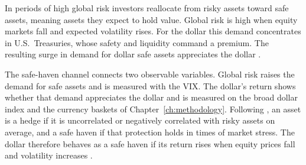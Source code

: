 
In periods of high global risk investors reallocate from risky assets toward safe assets, meaning assets they expect to hold value. Global risk is high when equity markets fall and expected volatility rises. For the dollar this demand concentrates in U.S.\ Treasuries, whose safety and liquidity command a premium. The resulting surge in demand for dollar safe assets appreciates the dollar \parencite{jiang_krishnamurthy_lustig_2021}.
 
The safe-haven channel connects two observable variables. Global risk raises the demand for safe assets and is measured with the VIX. The dollar's return shows whether that demand appreciates the dollar and is measured on the broad dollar index and the currency baskets of Chapter~\ref{ch:methodology}. Following \textcite{baur_lucey_2010}, an asset is a hedge if it is uncorrelated or negatively correlated with risky assets on average, and a safe haven if that protection holds in times of market stress. The dollar therefore behaves as a safe haven if its return rises when equity prices fall and volatility increases \parencite{ranaldo_soderlind_2010,debock_decarvalhofilho_2015}.
 
